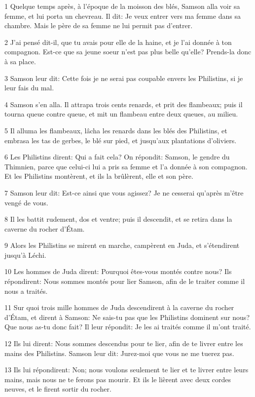 \par 1 Quelque temps après, à l'époque de la moisson des blés, Samson alla voir sa femme, et lui porta un chevreau. Il dit: Je veux entrer vers ma femme dans sa chambre. Mais le père de sa femme ne lui permit pas d'entrer.
\par 2 J'ai pensé dit-il, que tu avais pour elle de la haine, et je l'ai donnée à ton compagnon. Est-ce que sa jeune soeur n'est pas plus belle qu'elle? Prends-la donc à sa place.
\par 3 Samson leur dit: Cette fois je ne serai pas coupable envers les Philistins, si je leur fais du mal.
\par 4 Samson s'en alla. Il attrapa trois cents renards, et prit des flambeaux; puis il tourna queue contre queue, et mit un flambeau entre deux queues, au milieu.
\par 5 Il alluma les flambeaux, lâcha les renards dans les blés des Philistins, et embrasa les tas de gerbes, le blé sur pied, et jusqu'aux plantations d'oliviers.
\par 6 Les Philistins dirent: Qui a fait cela? On répondit: Samson, le gendre du Thimnien, parce que celui-ci lui a pris sa femme et l'a donnée à son compagnon. Et les Philistins montèrent, et ils la brûlèrent, elle et son père.
\par 7 Samson leur dit: Est-ce ainsi que vous agissez? Je ne cesserai qu'après m'être vengé de vous.
\par 8 Il les battit rudement, dos et ventre; puis il descendit, et se retira dans la caverne du rocher d'Étam.
\par 9 Alors les Philistins se mirent en marche, campèrent en Juda, et s'étendirent jusqu'à Léchi.
\par 10 Les hommes de Juda dirent: Pourquoi êtes-vous montés contre nous? Ils répondirent: Nous sommes montés pour lier Samson, afin de le traiter comme il nous a traités.
\par 11 Sur quoi trois mille hommes de Juda descendirent à la caverne du rocher d'Étam, et dirent à Samson: Ne sais-tu pas que les Philistins dominent sur nous? Que nous as-tu donc fait? Il leur répondit: Je les ai traités comme il m'ont traité.
\par 12 Ils lui dirent: Nous sommes descendus pour te lier, afin de te livrer entre les mains des Philistins. Samson leur dit: Jurez-moi que vous ne me tuerez pas.
\par 13 Ils lui répondirent: Non; nous voulons seulement te lier et te livrer entre leurs mains, mais nous ne te ferons pas mourir. Et ils le lièrent avec deux cordes neuves, et le firent sortir du rocher.
